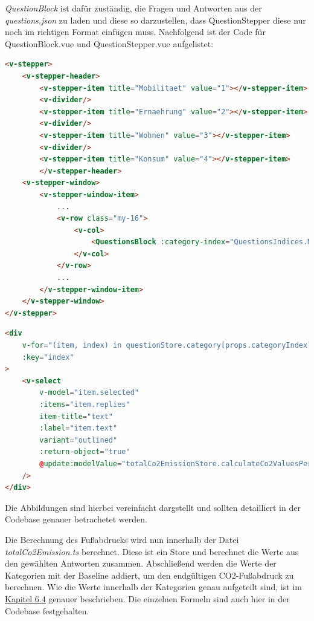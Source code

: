 \textit{QuestionBlock} ist dafür zuständig, die Fragen und Antworten aus der \textit{questions.json} zu laden und diese so darzustellen, dass QuestionStepper diese nur noch im richtigen Format einfügen muss.
Nachfolgend ist der Code für QuestionBlock.vue und QuestionStepper.vue aufgelistet:

\begin{lstlisting}[language={html}, caption={QuestionStepper.vue}]
<v-stepper>
    <v-stepper-header>
        <v-stepper-item title="Mobilitaet" value="1"></v-stepper-item>
        <v-divider/>
        <v-stepper-item title="Ernaehrung" value="2"></v-stepper-item>
        <v-divider/>
        <v-stepper-item title="Wohnen" value="3"></v-stepper-item>
        <v-divider/>
        <v-stepper-item title="Konsum" value="4"></v-stepper-item>
        </v-stepper-header>
    <v-stepper-window>
        <v-stepper-window-item>
            ...
            <v-row class="my-16">
                <v-col>
                    <QuestionsBlock :category-index="QuestionsIndices.MOBILITY"/>
                </v-col>
            </v-row>
            ...
        </v-stepper-window-item>
    </v-stepper-window>
</v-stepper>
\end{lstlisting}

\begin{lstlisting}[language={html}, caption={QuestionBlock.vue}]
<div
    v-for="(item, index) in questionStore.category[props.categoryIndex].questions"
    :key="index"
>
    <v-select
        v-model="item.selected"
        :items="item.replies"
        item-title="text"
        :label="item.text"
        variant="outlined"
        :return-object="true"
        @update:modelValue="totalCo2EmissionStore.calculateCo2ValuesPerCategory()"
    />
</div>
\end{lstlisting}

Die Abbildungen sind hierbei vereinfacht dargstellt und sollten detailliert in der Codebase genauer betrachetet werden.

Die Berechnung des Fußabdrucks wird nun innerhalb der Datei \textit{totalCo2Emission.ts} berechnet.
Diese ist ein Store und berechnet die Werte aus den gewählten Antworten zusammen.
Abschließend werden die Werte der Kategorien mit der Baseline addiert, um den endgültigen CO2-Fußabdruck zu berechnen.
Wie die Werte innerhalb der Kategorien genau aufgeteilt sind, ist im \hyperref[sec:anpassung-der-questions-json]{Kapitel 6.4} genauer beschrieben.
Die einzelnen Formeln sind auch hier in der Codebase festgehalten.

